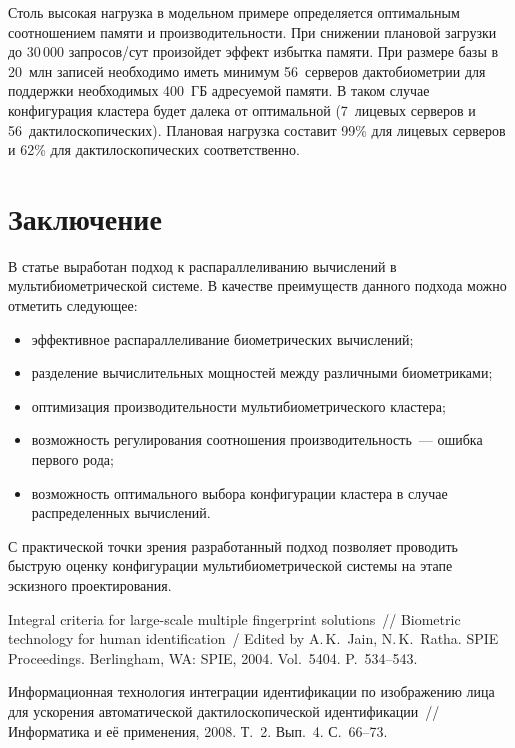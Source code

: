 \begin{multicols}{2}
     Столь высокая нагрузка в модельном примере определяется оптимальным 
соотношением памяти и производительности. При снижении плановой загрузки до 
30\,000 запросов/сут произойдет эффект избытка памяти. При размере базы в 20~млн 
записей необходимо иметь минимум 56~серверов дактобиометрии для поддержки 
необходимых 400~ГБ адресуемой памяти. В таком случае конфигурация кластера будет 
далека от оптимальной (7~лицевых серверов и 56~дактилоскопических). Плановая 
нагрузка составит 99\% для лицевых серверов и 62\% для дактилоскопических 
соответственно. 
     
     \section{Заключение}
     
     В статье выработан подход к распараллеливанию вычислений в 
мультибиометрической системе. В качестве преимуществ данного подхода можно 
отметить следующее:
     \begin{itemize}
\item эффективное распараллеливание биометрических вычислений;
\item разделение вычислительных мощностей между различными биометриками;
\item оптимизация производительности мультибиометрического кластера;
\item возможность регулирования соотношения производительность~--- ошибка 
первого рода;
\item возможность оптимального выбора конфигурации кластера в случае 
распределенных вы\-чис\-лений.
\end{itemize}

     С практической точки зрения разработанный подход позволяет проводить 
быструю оценку конфигурации мультибиометрической системы на этапе эскизного 
проектирования.
     
     
     {\small\frenchspacing
{%
\begin{thebibliography}{99}

Integral criteria for large-scale multiple fingerprint solutions~// Biometric technology for human 
identification~/ Edited by A.\,K.~Jain, N.\,K.~Ratha. SPIE Proceedings.  
Berlingham, WA: SPIE, 2004. Vol.~5404. P.~534--543.

Информационная технология интеграции идентификации по изображению лица для ускорения 
автоматической дактилоскопической идентификации~// Информатика и её применения, 2008. Т.~2. Вып.~4.
С.~66--73.


\end{thebibliography}}}
\end{multicols}
